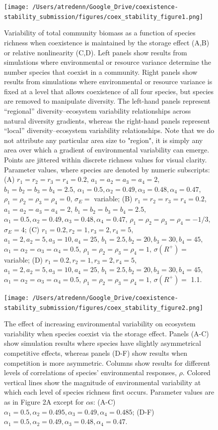 \documentclass[12pt,]{article}
\begin{document}
\begin{figure}[!ht]
  \centering
      \texttt{[image: /Users/atredenn/Google\_Drive/coexistence-stability\_submission/figures/coex\_stability\_figure1.png]}
  \caption{Variability of total community biomass as a function of species richness when coexistence is maintained by the storage effect (A,B) or relative nonlinearity (C,D). Left panels show results from simulations where environmental or resource variance determine the number species that coexist in a community. Right panels show results from simulations where environmental or resource variance is fixed at a level that allows coexistence of all four species, but species are removed to manipulate diversity. The left-hand panels represent ``regional'' diversity--ecosystem variability relationships across natural diversity gradients, whereas the right-hand panels represent ``local'' diversity--ecosystem variability relationships. Note that we do not attribute any particular area size to "region", it is simply any area over which a gradient of environmental variability can emerge. Points are jittered within discrete richness values for visual clarity. Parameter values, where species are denoted by numeric subscripts: (A) $r_1 = r_2 = r_3 = r_4 = 0.2$, $a_1 = a_2 = a_3 = a_4 = 2$, $b_1 = b_2 = b_3 = b_4 = 2.5$, $\alpha_1 = 0.5, \alpha_2 = 0.49, \alpha_3 = 0.48, \alpha_4 = 0.47$, $\rho_1 = \rho_2 = \rho_3 = \rho_4 = 0$, $\sigma_E =$ variable; (B) $r_1 = r_2 = r_3 = r_4 = 0.2$, $a_1 = a_2 = a_3 = a_4 = 2$, $b_1 = b_2 = b_3 = b_4 = 2.5$, $\alpha_1 = 0.5, \alpha_2 = 0.49, \alpha_3 = 0.48, \alpha_4 = 0.47$, $\rho_1 = \rho_2 = \rho_3 = \rho_4 = -1/3$, $\sigma_E = 4$; (C) $r_1 = 0.2, r_2 = 1, r_3 = 2, r_4 = 5$, $a_1 = 2, a_2 = 5, a_3 = 10, a_4 = 25$, $b_1 = 2.5, b_2 = 20, b_3 = 30, b_4 = 45$, $\alpha_1 = \alpha_2 = \alpha_3 = \alpha_4 = 0.5$, $\rho_1 = \rho_2 = \rho_3 = \rho_4 = 1$, $\sigma(R^+) =$ variable; (D) $r_1 = 0.2, r_2 = 1, r_3 = 2, r_4 = 5$, $a_1 = 2, a_2 = 5, a_3 = 10, a_4 = 25$, $b_1 = 2.5, b_2 = 20, b_3 = 30, b_4 = 45$, $\alpha_1 = \alpha_2 = \alpha_3 = \alpha_4 = 0.5$, $\rho_1 = \rho_2 = \rho_3 = \rho_4 = 1$, $\sigma(R^+) =$ 1.1.}
\end{figure}

\newpage{}

\begin{figure}[!ht]
  \centering
      \texttt{[image: /Users/atredenn/Google\_Drive/coexistence-stability\_submission/figures/coex\_stability\_figure2.png]}
  \caption{The effect of increasing environmental variability on ecosystem variability when species coexist via the storage effect. Panels (A-C) show simulation results where species have slightly asymmetrical competitive effects, whereas panels (D-F) show results when competition is more asymmetric. Columns show results for different levels of correlations of species' environmental responses, $\rho$. Colored vertical lines show the magnitude of environmental variability at which each level of species richness first occurs. Parameter values are as in Figure 2A except for $\alpha$s: (A-C) $\alpha_1 = 0.5, \alpha_2 = 0.495, \alpha_3 = 0.49, \alpha_4 = 0.485$; (D-F) $\alpha_1 = 0.5, \alpha_2 = 0.49, \alpha_3 = 0.48, \alpha_4 = 0.47$.}
\end{figure}
\end{document}
